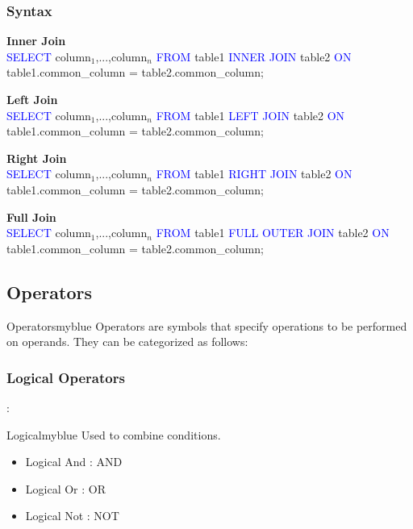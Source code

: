 \subsubsection*{ \textbf{Syntax}}
\begin{tcolorbox}[title =Joins]
 \textbf{Inner Join}\\
\textcolor{blue}{SELECT} column$_{1}$,...,column$_{n}$ \textcolor{blue}{FROM} table1 \textcolor{blue}{INNER JOIN} 
table2 \textcolor{blue}{ON} table1.common\_column = table2.common\_column;

 \textbf{Left Join}\\
\textcolor{blue}{SELECT} column$_{1}$,...,column$_{n}$ \textcolor{blue}{FROM} table1 \textcolor{blue}{LEFT JOIN} 
table2 \textcolor{blue}{ON} table1.common\_column = table2.common\_column;

\textbf{Right Join}\\
\textcolor{blue}{SELECT} column$_{1}$,...,column$_{n}$ \textcolor{blue}{FROM} table1 \textcolor{blue}{RIGHT JOIN} 
table2 \textcolor{blue}{ON} table1.common\_column = table2.common\_column;

\textbf{Full Join}\\
\textcolor{blue}{SELECT} column$_{1}$,...,column$_{n}$ \textcolor{blue}{FROM} table1 \textcolor{blue}{FULL OUTER JOIN} 
table2 \textcolor{blue}{ON} table1.common\_column = table2.common\_column;
\end{tcolorbox}


\subsection{Operators}
\begin{prettyBox}{Operators}{myblue}
Operators are symbols that specify operations to be performed on operands. They can be categorized as follows:
\end{prettyBox}

\subsubsection{Logical Operators}:
\begin{prettyBox}{Logical}{myblue}
Used to combine conditions.
          \begin{itemize} 
              \item Logical And : AND 
              \item Logical Or : OR 
              \item Logical Not : NOT 
              \end{itemize} 
\end{prettyBox}

